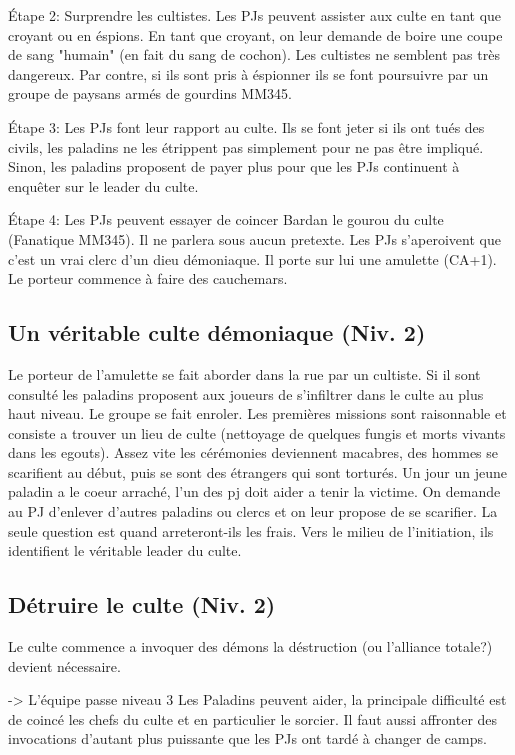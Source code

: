 Étape 2: Surprendre les cultistes. Les PJs peuvent assister aux culte en tant que croyant ou en éspions.
En tant que croyant, on leur demande de boire une coupe de sang "humain" (en fait du sang de cochon).
Les cultistes ne semblent pas très dangereux. Par contre, si ils sont pris à éspionner ils se font 
poursuivre par un groupe de paysans armés de gourdins MM345.

Étape 3: Les PJs font leur rapport au culte. Ils se font jeter si ils ont tués des civils, les paladins ne 
les étrippent pas simplement pour ne pas être impliqué. Sinon, les paladins proposent de payer plus pour 
que les PJs continuent à enquêter sur le leader du culte.

Étape 4: Les PJs peuvent essayer de coincer Bardan le gourou du culte (Fanatique MM345). Il ne parlera
sous aucun pretexte. Les PJs s'aperoivent que c'est un vrai clerc d'un dieu démoniaque. Il porte sur lui 
une amulette (CA+1). Le porteur commence à faire des cauchemars.

\subsection{Un véritable culte démoniaque (Niv. 2)}

Le porteur de l'amulette se fait aborder dans la rue par un cultiste. Si il sont consulté les paladins
proposent aux joueurs de s'infiltrer dans le culte au plus haut niveau. Le groupe se fait enroler. 
Les premières missions sont raisonnable et consiste a trouver un lieu de culte (nettoyage de quelques
fungis et morts vivants dans les egouts). Assez vite les cérémonies deviennent macabres, des hommes se 
scarifient au début, puis se sont des étrangers qui sont torturés. Un jour un jeune paladin a le coeur 
arraché, l'un des pj doit aider a tenir la victime. On demande au PJ d'enlever d'autres paladins ou
clercs et on leur propose de se scarifier. La seule question est quand arreteront-ils les frais. Vers le 
milieu de l'initiation, ils identifient le véritable leader du culte.

\subsection{Détruire le culte (Niv. 2)}

Le culte commence a invoquer des démons la déstruction (ou l'alliance totale?) devient nécessaire.

 -> L'équipe passe niveau 3
Les Paladins peuvent aider, la principale difficulté est de coincé les chefs du culte et en particulier
le sorcier. Il faut aussi affronter des invocations d'autant plus puissante que les PJs ont tardé à changer
de camps. 



